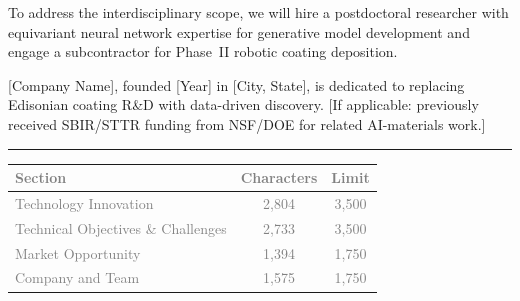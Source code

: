 \documentclass[11pt,letterpaper]{article}
\begin{document}
To address the interdisciplinary scope, we will hire a postdoctoral researcher with equivariant neural network expertise for generative model development and engage a subcontractor for Phase~II robotic coating deposition.

[Company Name], founded [Year] in [City, State], is dedicated to replacing Edisonian coating R\&D with data-driven discovery. [If applicable: previously received SBIR/STTR funding from NSF/DOE for related AI-materials work.]


\vspace{1cm}
\noindent\textcolor{nsfblue}{\rule{\textwidth}{1pt}}

\begin{center}
\small\textcolor{gray}{
\begin{tabular}{lcc}
\textbf{Section} & \textbf{Characters} & \textbf{Limit} \\
\hline
Technology Innovation & 2,804 & 3,500 \\
Technical Objectives \& Challenges & 2,733 & 3,500 \\
Market Opportunity & 1,394 & 1,750 \\
Company and Team & 1,575 & 1,750 \\
\end{tabular}
}
\end{center}
\end{document}
